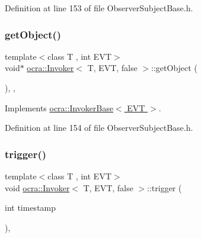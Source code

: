 Definition at line 153 of file Observer\+Subject\+Base.\+h.

\hypertarget{classocra_1_1Invoker_3_01T_00_01EVT_00_01false_01_4_ad77a4342ddfd1b1e1387065276c54246}{}\label{classocra_1_1Invoker_3_01T_00_01EVT_00_01false_01_4_ad77a4342ddfd1b1e1387065276c54246} 
\subsubsection{\texorpdfstring{get\+Object()}{getObject()}}
{\footnotesize\ttfamily template$<$class T , int E\+VT$>$ \\
void$\ast$ \hyperlink{classocra_1_1Invoker}{ocra\+::\+Invoker}$<$ T, E\+VT, false $>$\+::get\+Object (\begin{DoxyParamCaption}{ }\end{DoxyParamCaption})\hspace{0.3cm}{\ttfamily [inline]}, {\ttfamily [protected]}, {\ttfamily [virtual]}}



Implements \hyperlink{classocra_1_1InvokerBase_a90d81926209cb3119933412f742bc245}{ocra\+::\+Invoker\+Base$<$ E\+V\+T $>$}.



Definition at line 154 of file Observer\+Subject\+Base.\+h.

\hypertarget{classocra_1_1Invoker_3_01T_00_01EVT_00_01false_01_4_a740261f9f9c3278c9668d192eae56c2a}{}\label{classocra_1_1Invoker_3_01T_00_01EVT_00_01false_01_4_a740261f9f9c3278c9668d192eae56c2a} 
\subsubsection{\texorpdfstring{trigger()}{trigger()}}
{\footnotesize\ttfamily template$<$class T , int E\+VT$>$ \\
void \hyperlink{classocra_1_1Invoker}{ocra\+::\+Invoker}$<$ T, E\+VT, false $>$\+::trigger (\begin{DoxyParamCaption}\item[{int}]{timestamp }\end{DoxyParamCaption})\hspace{0.3cm}{\ttfamily [inline]}, {\ttfamily [virtual]}}

